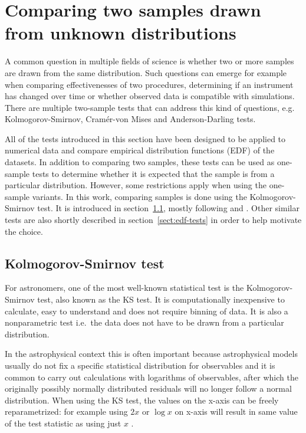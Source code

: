 \documentclass[english, twoside]{HYgradu}
\begin{document}
\section{Comparing two samples drawn from unknown distributions} \label{sect:statistical_tests}
A common question in multiple fields of science is whether two or more samples are drawn from the same distribution. Such questions can emerge for example when comparing effectivenesses of two procedures, determining if an instrument has changed over time or whether observed data is compatible with simulations. There are multiple two-sample tests that can address this kind of questions, e.g. Kolmogorov-Smirnov, Cram\'er-von Mises and Anderson-Darling tests.

All of the tests introduced in this section have been designed to be applied to numerical data and compare empirical distribution functions (EDF) of the datasets. In addition to comparing two samples, these tests can be used as one-sample tests to determine whether it is expected that the sample is from a particular distribution. However, some restrictions apply when using the one-sample variants. In this work, comparing samples is done using the Kolmogorov-Smirnov test. It is introduced in section~\ref{sect:ks}, mostly following \citet{bohm2010introduction} and \citet{feigelson2012modern}. Other similar tests are also shortly described in section~\ref{sect:edf-tests} in order to help motivate the choice.


\subsection{Kolmogorov-Smirnov test} \label{sect:ks}
For astronomers, one of the most well-known statistical test is the Kolmogorov-Smirnov test, also known as the KS test. It is computationally inexpensive to calculate, easy to understand and does not require binning of data. It is also a nonparametric test i.e.\ the data does not have to be drawn from a particular distribution.

In the astrophysical context this is often important because astrophysical models usually do not fix a specific statistical distribution for observables and it is common to carry out calculations with logarithms of observables, after which the originally possibly normally distributed residuals  will no longer follow a normal distribution. When using the KS test, the values on the x-axis can be freely reparametrized: for example using $2x$ or $\log x$ on x-axis will result in same value of the test statistic as using just $x$ \citep{press2007numerical}.
\end{document}

